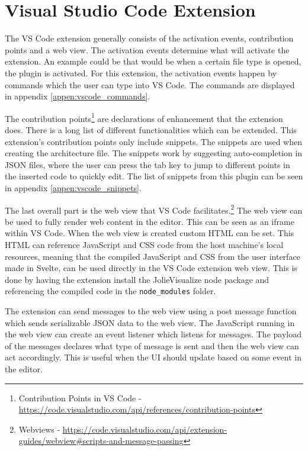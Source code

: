 \section{Visual Studio Code Extension}
The VS Code extension generally consists of the activation events, contribution points and a web view.
The activation events determine what will activate the extension. An example could be that would be when a certain file type is opened, the plugin is activated.
For this extension, the activation events happen by commands which the user can type into VS Code. The commands are displayed in appendix \ref*{appen:vscode_commands}.

The contribution points\footnote{Contribution Points in VS Code - \url{https://code.visualstudio.com/api/references/contribution-points}} are declarations of enhancement that the extension does. There is a long list of different functionalities which can be extended.
This extension's contribution points only include snippets. The snippets are used when creating the architecture file. The snippets work by suggesting auto-completion in JSON files, where the user can press the tab key to jump to different points in the inserted code to quickly edit.
The list of snippets from this plugin can be seen in appendix \ref*{appen:vscode_snippets}.

The last overall part is the web view that VS Code facilitates.\footnote{Webviews - \url{https://code.visualstudio.com/api/extension-guides/webview\#scripts-and-message-passing}} The web view can be used to fully render web content in the editor.
This can be seen as an iframe within VS Code. When the web view is created custom HTML can be set. This HTML can reference JavaScript and CSS code from the host machine's local resources, meaning that the compiled JavaScript and CSS from the user interface made in Svelte, can be used directly in the VS Code extension web view.
This is done by having the extension install the JolieVisualize node package and referencing the compiled code in the \texttt{node\_modules} folder.

The extension can send messages to the web view using a post message function which sends serializable JSON data to the web view.
The JavaScript running in the web view can create an event listener which listens for messages. The payload of the messages declares what type of message is sent and then the web view can act accordingly.
This is useful when the UI should update based on some event in the editor.

